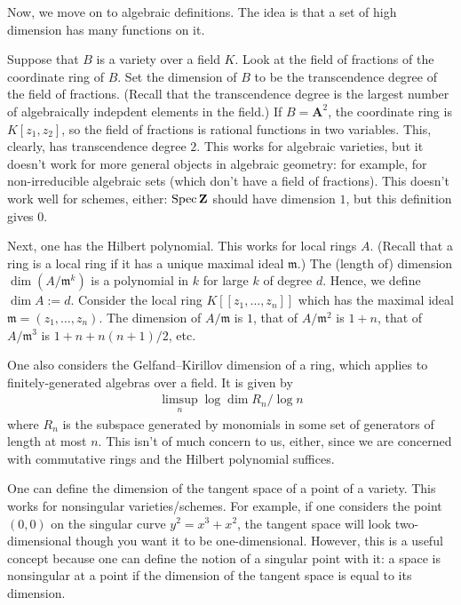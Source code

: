 \documentclass [11 pt, oneside] {article}
\begin{document}
Now, we move on to algebraic definitions. The idea is that a set of high dimension has many functions on it.

Suppose that $B$ is a variety over a field $K$. Look at the field of fractions of the coordinate ring of $B$. Set the dimension of $B$ to be the transcendence degree of the field of fractions. (Recall that the transcendence degree is the largest number of algebraically indepdent elements in the field.) If $B=\mathbf{A}^2$, the coordinate ring is $K[z_1,z_2]$, so the field of fractions is rational functions in two variables. This, clearly, has transcendence degree $2$. This works for algebraic varieties, but it doesn't work for more general objects in algebraic geometry: for example, for non-irreducible algebraic sets (which don't have a field of fractions). This doesn't work well for schemes, either: $\operatorname{Spec} \mathbf Z$ should have dimension $1$, but this definition gives $0$.

Next, one has the Hilbert polynomial. This works for local rings $A$. (Recall that a ring is a local ring if it has a unique maximal ideal $\mathfrak{m}$.) The (length of) dimension $\dim(A/\mathfrak{m}^k)$ is a polynomial in $k$ for large $k$ of degree $d$. Hence, we define $\dim A := d$. Consider the local ring $K [\![z_1,\hdots, z_n]\!]$ which has the maximal ideal $\mathfrak{m} = (z_1,\hdots, z_n)$. The dimension of $A/\mathfrak{m}$ is $1$, that of $A/\mathfrak{m}^2$ is $1+n$, that of $A/\mathfrak{m}^3$ is $1+n+n(n+1)/2$, etc.

One also considers the Gelfand--Kirillov dimension of a ring, which applies to finitely-generated algebras over a field. It is given by
\begin{align*}
	\limsup_{n} \log \dim R_n / \log n
\end{align*}
where $R_n$ is the subspace generated by monomials in some set of generators of length at most $n$. This isn't of much concern to us, either, since we are concerned with commutative rings and the Hilbert polynomial suffices.

One can define the dimension of the tangent space of a point of a variety. This works for nonsingular varieties/schemes. For example, if one considers the point $(0,0)$ on the singular curve $y^2=x^3+x^2$, the tangent space will look two-dimensional though you want it to be one-dimensional. However, this is a useful concept because one can define the notion of a singular point with it: a space is nonsingular at a point if the dimension of the tangent space is equal to its dimension.
\end{document}
